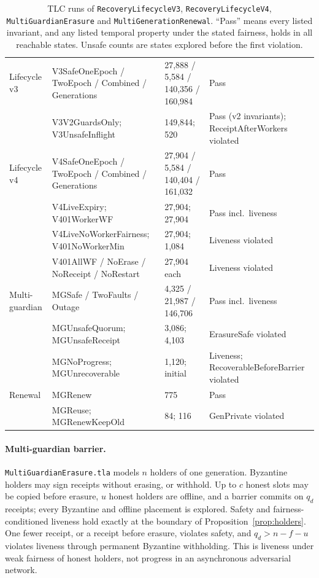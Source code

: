 \documentclass[pdflatex,sn-mathphys-num]{sn-jnl}
\theoremstyle{plain}
\theoremstyle{definition}
\newcommand{\code}[1]{\texttt{#1}}
\begin{document}
\begin{table}[htbp]
\caption{TLC runs of \code{RecoveryLifecycleV3}, \code{RecoveryLifecycleV4}, \code{MultiGuardianErasure} and \code{MultiGenerationRenewal}. ``Pass'' means every listed invariant, and any listed temporal property under the stated fairness, holds in all reachable states. Unsafe counts are states explored before the first violation.}\label{tab:tlc}
\centering\scriptsize
\altrows
\begin{tabularx}{\linewidth}{@{}p{.19\linewidth}Yp{.17\linewidth}p{.2\linewidth}@{}}\toprule
{} &  &  & \\\midrule
Lifecycle v3 & V3SafeOneEpoch / TwoEpoch / Combined / Generations & 27,888 / 5,584 / 140,356 / 160,984 & Pass\\
 & V3V2GuardsOnly; V3UnsafeInflight & 149,844; 520 & Pass (v2 invariants); Receipt\-After\-Workers violated\\
Lifecycle v4 & V4SafeOneEpoch / TwoEpoch / Combined / Generations & 27,904 / 5,584 / 140,404 / 161,032 & Pass\\
 & V4LiveExpiry; V401WorkerWF & 27,904; 27,904 & Pass incl.\ liveness\\
 & V4LiveNoWorkerFairness; V401NoWorkerMin & 27,904; 1,084 & Liveness violated\\
 & V401AllWF / NoErase / NoReceipt / NoRestart & 27,904 each & Liveness violated\\
Multi-guardian & MGSafe / TwoFaults / Outage & 4,325 / 21,987 / 146,706 & Pass incl.\ liveness\\
 & MGUnsafeQuorum; MGUnsafeReceipt & 3,086; 4,103 & ErasureSafe violated\\
 & MGNoProgress; MGUnrecoverable & 1,120; initial & Liveness; Recoverable\-Before\-Barrier violated\\
Renewal & MGRenew & 775 & Pass\\
 & MGReuse; MGRenewKeepOld & 84; 116 & GenPrivate violated\\\bottomrule
\end{tabularx}
\end{table}

\paragraph{Multi-guardian barrier.}
\code{MultiGuardianErasure.tla} models $n$ holders of one generation. Byzantine holders may sign receipts without erasing, or withhold. Up to $c$ honest slots may be copied before erasure, $u$ honest holders are offline, and a barrier commits on $q_d$ receipts; every Byzantine and offline placement is explored. Safety and fairness-conditioned liveness hold exactly at the boundary of Proposition~\ref{prop:holders}. One fewer receipt, or a receipt before erasure, violates safety, and $q_d>n-f-u$ violates liveness through permanent Byzantine withholding. This is liveness under weak fairness of honest holders, not progress in an asynchronous adversarial network.
\end{document}
